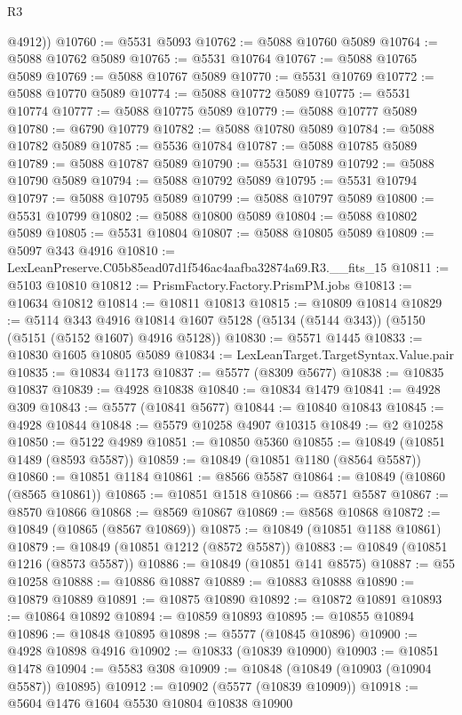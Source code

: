 \begin{lexlean}{R3}
\begin{coremodule}
        @4912))
@10760 := @5531 @5093
@10762 := @5088 @10760 @5089
@10764 := @5088 @10762 @5089
@10765 := @5531 @10764
@10767 := @5088 @10765 @5089
@10769 := @5088 @10767 @5089
@10770 := @5531 @10769
@10772 := @5088 @10770 @5089
@10774 := @5088 @10772 @5089
@10775 := @5531 @10774
@10777 := @5088 @10775 @5089
@10779 := @5088 @10777 @5089
@10780 := @6790 @10779
@10782 := @5088 @10780 @5089
@10784 := @5088 @10782 @5089
@10785 := @5536 @10784
@10787 := @5088 @10785 @5089
@10789 := @5088 @10787 @5089
@10790 := @5531 @10789
@10792 := @5088 @10790 @5089
@10794 := @5088 @10792 @5089
@10795 := @5531 @10794
@10797 := @5088 @10795 @5089
@10799 := @5088 @10797 @5089
@10800 := @5531 @10799
@10802 := @5088 @10800 @5089
@10804 := @5088 @10802 @5089
@10805 := @5531 @10804
@10807 := @5088 @10805 @5089
@10809 := @5097 @343 @4916
@10810 := LexLeanPreserve.C05b85ead07d1f546ac4aafba32874a69.R3.__fits_15
@10811 := @5103 @10810
@10812 := PrismFactory.Factory.PrismPM.jobs
@10813 := @10634 @10812
@10814 := @10811 @10813
@10815 := @10809 @10814
@10829 := @5114
    @343
    @4916
    @10814
    @1607
    @5128
    (@5134 (@5144 @343))
    (@5150 (@5151 (@5152 @1607) @4916 @5128))
@10830 := @5571 @1445
@10833 := @10830 @1605 @10805 @5089
@10834 := LexLeanTarget.TargetSyntax.Value.pair
@10835 := @10834 @1173
@10837 := @5577 (@8309 @5677)
@10838 := @10835 @10837
@10839 := @4928 @10838
@10840 := @10834 @1479
@10841 := @4928 @309
@10843 := @5577 (@10841 @5677)
@10844 := @10840 @10843
@10845 := @4928 @10844
@10848 := @5579 @10258 @4907 @10315
@10849 := @2 @10258
@10850 := @5122 @4989
@10851 := @10850 @5360
@10855 := @10849 (@10851 @1489 (@8593 @5587))
@10859 := @10849 (@10851 @1180 (@8564 @5587))
@10860 := @10851 @1184
@10861 := @8566 @5587
@10864 := @10849 (@10860 (@8565 @10861))
@10865 := @10851 @1518
@10866 := @8571 @5587
@10867 := @8570 @10866
@10868 := @8569 @10867
@10869 := @8568 @10868
@10872 := @10849 (@10865 (@8567 @10869))
@10875 := @10849 (@10851 @1188 @10861)
@10879 := @10849 (@10851 @1212 (@8572 @5587))
@10883 := @10849 (@10851 @1216 (@8573 @5587))
@10886 := @10849 (@10851 @141 @8575)
@10887 := @55 @10258
@10888 := @10886 @10887
@10889 := @10883 @10888
@10890 := @10879 @10889
@10891 := @10875 @10890
@10892 := @10872 @10891
@10893 := @10864 @10892
@10894 := @10859 @10893
@10895 := @10855 @10894
@10896 := @10848 @10895
@10898 := @5577 (@10845 @10896)
@10900 := @4928 @10898 @4916
@10902 := @10833 (@10839 @10900)
@10903 := @10851 @1478
@10904 := @5583 @308
@10909 := @10848 (@10849 (@10903 (@10904 @5587)) @10895)
@10912 := @10902 (@5577 (@10839 @10909))
@10918 := @5604 @1476 @1604 @5530 @10804 @10838 @10900

\end{coremodule}
\end{lexlean}
